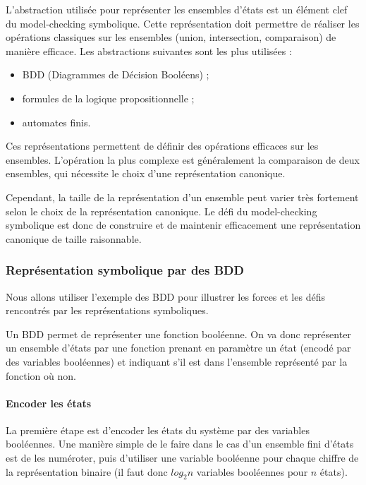 L'abstraction utilisée pour représenter les ensembles d'états est un élément
clef du model-checking symbolique. Cette représentation doit permettre de
réaliser les opérations classiques sur les ensembles (union, intersection,
comparaison) de manière efficace. Les abstractions suivantes sont les plus
utilisées :

\begin{itemize}
\item
  \ac{BDD} (Diagrammes de Décision Booléens) ;
\item
  formules de la logique propositionnelle ;
\item
  automates finis.
\end{itemize}

Ces représentations permettent de définir des opérations efficaces sur les
ensembles. L'opération la plus complexe est généralement la comparaison de deux
ensembles, qui nécessite le choix d'une représentation canonique.

Cependant, la taille de la représentation d'un ensemble peut varier très
fortement selon le choix de la représentation canonique. Le défi du
model-checking symbolique est donc de construire et de maintenir efficacement
une représentation canonique de taille raisonnable.

\subsubsection{Représentation symbolique par des BDD}

Nous allons utiliser l'exemple des \ac{BDD} pour illustrer les forces et les
défis rencontrés par les représentations symboliques.

Un \ac{BDD} permet de représenter une fonction booléenne.
On va donc représenter un ensemble d'états par une fonction prenant
en paramètre un état (encodé par des variables booléennes) et indiquant s’il est dans l'ensemble représenté par la fonction où non.

\paragraph{Encoder les états}
La première étape est d'encoder les états du système par des variables
booléennes. Une manière simple de le faire dans le cas d'un ensemble fini
d'états est de les numéroter, puis d'utiliser une variable booléenne pour chaque
chiffre de la représentation binaire (il faut donc \(log_2 n\) variables
booléennes pour \(n\) états).

